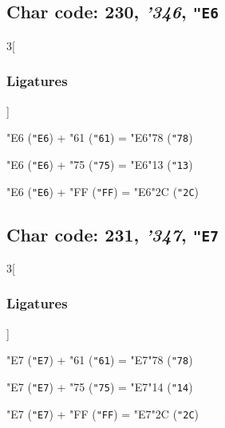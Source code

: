 \documentclass{article}
\newlength{\maxcharwidth}
\begin{document}
\subsection{Char code: 230, {\it'346}, {\tt"E6}}
\label{char_230}


\begin{multicols}{3}[\subsubsection{Ligatures}]

{\testfont\char"E6\noboundary} ({\tt"E6}) + {\testfont\char"61\noboundary} ({\tt"61}) = {\testfont\char"E6\noboundary}{\testfont\char"78\noboundary} ({\tt"78}) 

{\testfont\char"E6\noboundary} ({\tt"E6}) + {\testfont\char"75\noboundary} ({\tt"75}) = {\testfont\char"E6\noboundary}{\testfont\char"13\noboundary} ({\tt"13}) 

{\testfont\char"E6\noboundary} ({\tt"E6}) + {\testfont\char"FF\noboundary} ({\tt"FF}) = {\testfont\char"E6\noboundary}{\testfont\char"2C\noboundary} ({\tt"2C}) 

\end{multicols}

\subsection{Char code: 231, {\it'347}, {\tt"E7}}
\label{char_231}


\begin{multicols}{3}[\subsubsection{Ligatures}]

{\testfont\char"E7\noboundary} ({\tt"E7}) + {\testfont\char"61\noboundary} ({\tt"61}) = {\testfont\char"E7\noboundary}{\testfont\char"78\noboundary} ({\tt"78}) 

{\testfont\char"E7\noboundary} ({\tt"E7}) + {\testfont\char"75\noboundary} ({\tt"75}) = {\testfont\char"E7\noboundary}{\testfont\char"14\noboundary} ({\tt"14}) 

{\testfont\char"E7\noboundary} ({\tt"E7}) + {\testfont\char"FF\noboundary} ({\tt"FF}) = {\testfont\char"E7\noboundary}{\testfont\char"2C\noboundary} ({\tt"2C}) 

\end{multicols}
\end{document}
